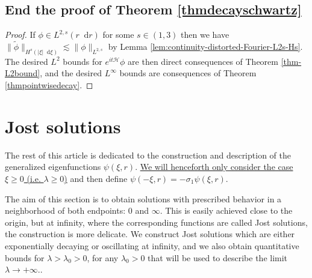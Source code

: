 \documentclass[11 pt]{amsart}
\theoremstyle{definition}
\theoremstyle{remark}
\numberwithin{equation}{section}
\newcommand{\dd}{\mathop{}\!\mathrm{d}}
\begin{document}
\subsection{End the proof of Theorem \ref{thmdecayschwartz}}

\begin{proof}
If $\phi \in L^{2,s}(r\dd r)$ for some $s\in (1,3)$ then we have $\| \widetilde \phi \|_{H^{s}(|\xi|\dd \xi)}\lesssim \| \phi \|_{L^{2,s}}$ by Lemma \ref{lem:continuity-distorted-Fourier-L2s-Hs}. The desired $L^2$ bounds for $e^{it \mathcal H}\phi$ are then direct consequences of Theorem \ref{thm-L2bound}, and the desired $L^\infty$ bounds are consequences of Theorem \ref{thmpointwisedecay}.
\end{proof}



\section{Jost solutions}\label{policia}

\label{sectionjost}

The rest of this article is dedicated to the construction and description of the generalized eigenfunctions $\psi(\xi,r)$. \underline{We will henceforth only consider the case $\xi \geqslant 0$ (i.e. $\lambda \geqslant 0$)} and then define $\psi(-\xi,r) = -\sigma_1 \psi(\xi,r)$.

The aim of this section is to obtain solutions with prescribed behavior in a neighborhood of both endpoints: $0$ and $\infty$. This is easily achieved close to the origin, but at infinity, where the corresponding functions are called Jost solutions, the construction is more delicate. We construct Jost solutions which are either exponentially decaying or oscillating at infinity, and we also obtain quantitative bounds for $\lambda > \lambda_0 > 0$, for any $\lambda_0>0$ that will be used to describe the limit $\lambda \rightarrow + \infty.$.
\end{document}
